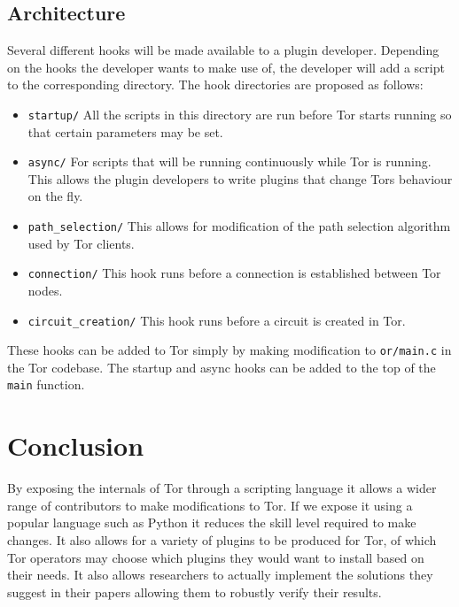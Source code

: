 \documentclass[9pt,technote]{IEEEtran}
\begin{document}
\subsection{Architecture}
Several different hooks will be made available to a plugin developer. Depending on
the hooks the developer wants to make use of, the developer will add a script to
the corresponding directory. The hook directories are proposed as follows:
\begin{itemize}
\item \texttt{startup/} All the scripts in this directory are run before Tor starts
	running so that certain parameters may be set.
\item \texttt{async/} For scripts that will be running continuously while Tor is
	running. This allows the plugin developers to write plugins that change
	Tors behaviour on the fly.
\item \texttt{path\_selection/} This allows for modification of the path
	selection algorithm used by Tor clients.
\item \texttt{connection/} This hook runs before a connection is established
	between Tor nodes.
\item \texttt{circuit\_creation/} This hook runs before a circuit is created in
	Tor.
\end{itemize}
These hooks can be added to Tor simply by making modification to
\texttt{or/main.c} in the Tor codebase. The startup and async hooks can be added
to the top of the \texttt{main} function.


\section{Conclusion}
By exposing the internals of Tor through a scripting language it allows a wider
range of contributors to make modifications to Tor. If we expose it using a
popular language such as Python it reduces the skill level required to make
changes. It also allows for a variety of plugins to be produced for Tor, of
which Tor operators may choose which plugins they would want to install based
on their needs. It also allows researchers to actually implement the solutions
they suggest in their papers allowing them to robustly verify their results.

\nocite{*}


\end{document}

